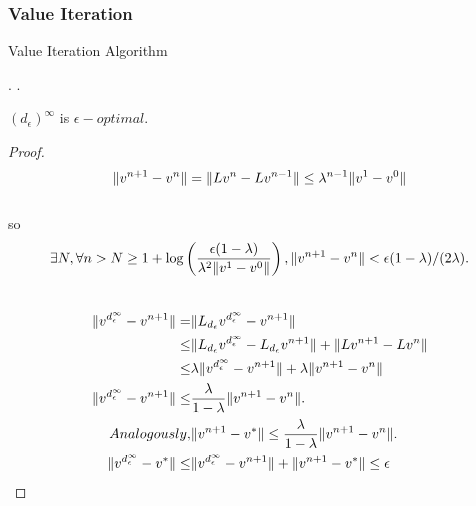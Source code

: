 \subsubsection{Value Iteration}%

\begin{algorithm}[h!]
    \caption{Value Iteration Algorithm}
    \begin{algorithmic}
            \EndIf.
        \EndFor.
        \State{}
    \end{algorithmic}
\end{algorithm}

\begin{theorem}
    $ {(d_{\epsilon})}^{\infty} $ is $ \epsilon-optimal $.
    \begin{proof}
        \[ \Arrowvert v^{n+1} - v^n \Arrowvert = \Arrowvert Lv^n - Lv^{n-1} \Arrowvert \le \lambda^{n-1} \Arrowvert v^1 - v^0 \Arrowvert \]\\
        so 
        \[ \exists N, \forall n > N \ge 1 + \log\left( \frac{\epsilon(1-\lambda)}{\lambda^2 \Arrowvert v^1 - v^0 \Arrowvert}  \right), \Arrowvert v^{n+1} - v^n \Arrowvert < \epsilon(1-\lambda)/(2\lambda). \]\\
        \begin{align*}
            \Arrowvert v^{d^{\infty}_\epsilon} - v^{n+1} \Arrowvert
            =& \Arrowvert L_{d_{\epsilon}} v^{d_{\epsilon}^{\infty}} - v^{n+1} \Arrowvert\\
            \le& \Arrowvert L_{d_{\epsilon}} v^{d_{\epsilon}^{\infty}} - L_{d_{\epsilon}} v^{n+1} \Arrowvert
            + \Arrowvert L v^{n+1}- L v^{n} \Arrowvert\\
            \le& \lambda\Arrowvert v^{d_{\epsilon}^{\infty}} - v^{n+1} \Arrowvert
            + \lambda\Arrowvert v^{n+1}- v^{n} \Arrowvert\\
            \Arrowvert v^{d^{\infty}_\epsilon} - v^{n+1} \Arrowvert
            \le& \frac{\lambda}{1-\lambda} \Arrowvert v^{n+1} - v^{n} \Arrowvert.\\
            Analogously,& \Arrowvert v^{n+1}- v^* \Arrowvert \le \frac{\lambda}{1-\lambda} \Arrowvert v^{n+1}-v^{n} \Arrowvert.\\
            \Arrowvert v^{d^{\infty}_\epsilon} - v^{*} \Arrowvert
            \le& \Arrowvert v^{d^{\infty}_\epsilon} - v^{n+1} \Arrowvert +
            \Arrowvert v^{n+1} - v^{*} \Arrowvert \le \epsilon
        \end{align*}
    \end{proof}
\end{theorem}

